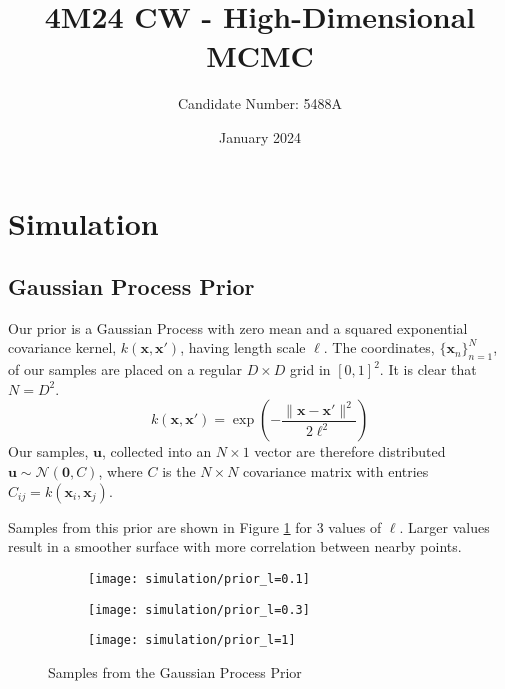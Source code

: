 \documentclass[11pt]{article}
\title{4M24 CW - High-Dimensional MCMC}
\author{Candidate Number: 5488A}
\date{January 2024}
\begin{document}

\setcounter{page}{1}

\maketitle

\section{Simulation}
\subsection{Gaussian Process Prior}
Our prior is a Gaussian Process with zero mean and a squared exponential covariance kernel, $k(\boldsymbol{x}, \boldsymbol{x}')$, having length scale $\ell$. The coordinates, $\{\boldsymbol{x}_n\}_{n=1}^{N}$, of our samples are placed on a regular $D \times D$ grid in $[0, 1]^2$. It is clear that $N = D^2$.
\begin{equation}
    k(\boldsymbol{x}, \boldsymbol{x}') = \exp\left(-\frac{\|\boldsymbol{x} - \boldsymbol{x}'\|^2}{2\ell^2}\right)
\end{equation}
Our samples, $\boldsymbol{u}$, collected into an $N \times 1$ vector are therefore distributed $\boldsymbol{u} \sim \mathcal{N}(\boldsymbol{0}, C)$, where $C$ is the $N \times N$ covariance matrix with entries $C_{ij} = k(\boldsymbol{x}_i, \boldsymbol{x}_j)$.

Samples from this prior are shown in Figure \ref{fig:gp_prior} for 3 values of $\ell$. Larger values result in a smoother surface with more correlation between nearby points.

\begin{figure}
    \centering
    \begin{subfigure}{0.3\textwidth}
        \texttt{[image: simulation/prior\_l=0.1]}
    \end{subfigure}
    \begin{subfigure}{0.3\textwidth}
        \texttt{[image: simulation/prior\_l=0.3]}
    \end{subfigure}
    \begin{subfigure}{0.3\textwidth}
        \texttt{[image: simulation/prior\_l=1]}
    \end{subfigure}
    \caption{Samples from the Gaussian Process Prior}
    \label{fig:gp_prior}
\end{figure}
\end{document}
